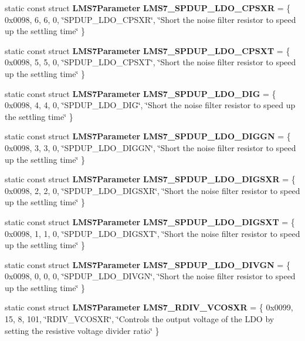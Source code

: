 \begin{DoxyCompactItemize}
\item 
static const struct {\bf L\+M\+S7\+Parameter} {\bf L\+M\+S7\+\_\+\+S\+P\+D\+U\+P\+\_\+\+L\+D\+O\+\_\+\+C\+P\+S\+XR} = \{ 0x0098, 6, 6, 0, \char`\"{}\+S\+P\+D\+U\+P\+\_\+\+L\+D\+O\+\_\+\+C\+P\+S\+X\+R\char`\"{}, \char`\"{}\+Short the noise filter resistor to speed up the settling time\char`\"{} \}
\item 
static const struct {\bf L\+M\+S7\+Parameter} {\bf L\+M\+S7\+\_\+\+S\+P\+D\+U\+P\+\_\+\+L\+D\+O\+\_\+\+C\+P\+S\+XT} = \{ 0x0098, 5, 5, 0, \char`\"{}\+S\+P\+D\+U\+P\+\_\+\+L\+D\+O\+\_\+\+C\+P\+S\+X\+T\char`\"{}, \char`\"{}\+Short the noise filter resistor to speed up the settling time\char`\"{} \}
\item 
static const struct {\bf L\+M\+S7\+Parameter} {\bf L\+M\+S7\+\_\+\+S\+P\+D\+U\+P\+\_\+\+L\+D\+O\+\_\+\+D\+IG} = \{ 0x0098, 4, 4, 0, \char`\"{}\+S\+P\+D\+U\+P\+\_\+\+L\+D\+O\+\_\+\+D\+I\+G\char`\"{}, \char`\"{}\+Short the noise filter resistor to speed up the settling time\char`\"{} \}
\item 
static const struct {\bf L\+M\+S7\+Parameter} {\bf L\+M\+S7\+\_\+\+S\+P\+D\+U\+P\+\_\+\+L\+D\+O\+\_\+\+D\+I\+G\+GN} = \{ 0x0098, 3, 3, 0, \char`\"{}\+S\+P\+D\+U\+P\+\_\+\+L\+D\+O\+\_\+\+D\+I\+G\+G\+N\char`\"{}, \char`\"{}\+Short the noise filter resistor to speed up the settling time\char`\"{} \}
\item 
static const struct {\bf L\+M\+S7\+Parameter} {\bf L\+M\+S7\+\_\+\+S\+P\+D\+U\+P\+\_\+\+L\+D\+O\+\_\+\+D\+I\+G\+S\+XR} = \{ 0x0098, 2, 2, 0, \char`\"{}\+S\+P\+D\+U\+P\+\_\+\+L\+D\+O\+\_\+\+D\+I\+G\+S\+X\+R\char`\"{}, \char`\"{}\+Short the noise filter resistor to speed up the settling time\char`\"{} \}
\item 
static const struct {\bf L\+M\+S7\+Parameter} {\bf L\+M\+S7\+\_\+\+S\+P\+D\+U\+P\+\_\+\+L\+D\+O\+\_\+\+D\+I\+G\+S\+XT} = \{ 0x0098, 1, 1, 0, \char`\"{}\+S\+P\+D\+U\+P\+\_\+\+L\+D\+O\+\_\+\+D\+I\+G\+S\+X\+T\char`\"{}, \char`\"{}\+Short the noise filter resistor to speed up the settling time\char`\"{} \}
\item 
static const struct {\bf L\+M\+S7\+Parameter} {\bf L\+M\+S7\+\_\+\+S\+P\+D\+U\+P\+\_\+\+L\+D\+O\+\_\+\+D\+I\+V\+GN} = \{ 0x0098, 0, 0, 0, \char`\"{}\+S\+P\+D\+U\+P\+\_\+\+L\+D\+O\+\_\+\+D\+I\+V\+G\+N\char`\"{}, \char`\"{}\+Short the noise filter resistor to speed up the settling time\char`\"{} \}
\item 
static const struct {\bf L\+M\+S7\+Parameter} {\bf L\+M\+S7\+\_\+\+R\+D\+I\+V\+\_\+\+V\+C\+O\+S\+XR} = \{ 0x0099, 15, 8, 101, \char`\"{}\+R\+D\+I\+V\+\_\+\+V\+C\+O\+S\+X\+R\char`\"{}, \char`\"{}\+Controls the output voltage of the L\+D\+O by setting the resistive voltage divider ratio\char`\"{} \}

\end{DoxyCompactItemize}
